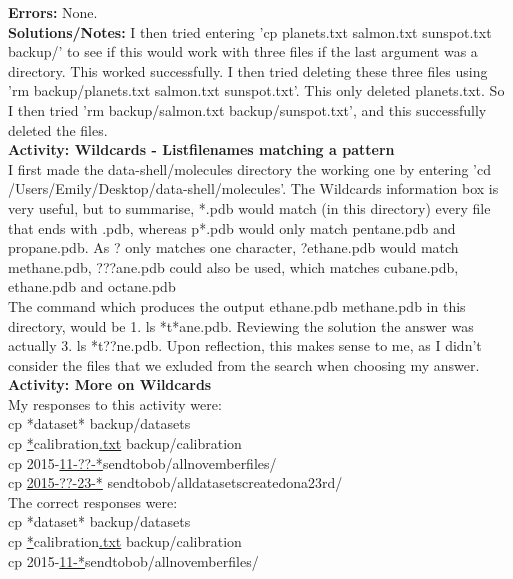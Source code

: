 \documentclass{article}
\begin{document}
\begin{FlushLeft}
\textbf{Errors:} None. \\
\textbf{Solutions/Notes:} I then tried entering 'cp planets.txt salmon.txt sunspot.txt backup/' to see if this would work with three files if the last argument was a directory. This worked successfully. I then tried deleting these three files using 'rm backup/planets.txt salmon.txt sunspot.txt'. This only deleted planets.txt. So I then tried 'rm backup/salmon.txt backup/sunspot.txt', and this successfully deleted the files.\\
\vspace{5mm}
\textbf{Activity: Wildcards - Listfilenames matching a pattern}\\
I first made the data-shell/molecules directory the working one by entering 'cd /Users/Emily/Desktop/data-shell/molecules'. The Wildcards information box is very useful, but to summarise, *.pdb would match (in this directory) every file that ends with .pdb, whereas p*.pdb would only match pentane.pdb and propane.pdb. As ? only matches one character, ?ethane.pdb would match methane.pdb, ???ane.pdb could also be used, which matches cubane.pdb, ethane.pdb and octane.pdb\\
The command which produces the output ethane.pdb methane.pdb in this directory, would be 1. ls *t*ane.pdb. Reviewing the solution the answer was actually 3. ls *t??ne.pdb. Upon reflection, this makes sense to me, as I didn't consider the files that we exluded from the search when choosing my answer.\\
\vspace{5mm}
\textbf{Activity: More on Wildcards}\\
My responses to this activity were:\\
cp *dataset* backup/datasets\\
cp \underline{*}calibration\underline{.txt} backup/calibration\\
cp 2015-\underline{11-??-*}send\textunderscore to\textunderscore bob/all\textunderscore november\textunderscore files/\\
cp \underline{2015-??-23-*} send\textunderscore to\textunderscore bob/all\textunderscore datasets\textunderscore created\textunderscore on\textunderscore a\textunderscore 23rd/\\
The correct responses were:\\
cp *dataset* backup/datasets\\
cp \underline{*}calibration\underline{.txt} backup/calibration\\
cp 2015-\underline{11-*}send\textunderscore to\textunderscore bob/all\textunderscore november\textunderscore files/\\

\end{FlushLeft}
\end{document}
